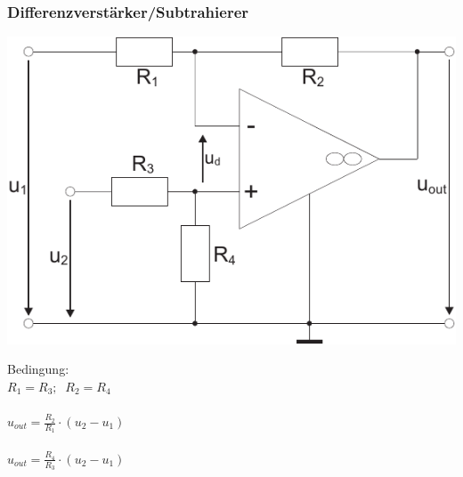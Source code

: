 \documentclass[a4paper,twocolumn,10pt]{article}
\begin{document}
\subsubsection*{Differenzverstärker/Subtrahierer}
\begin{minipage}[b]{0.25\textwidth}
\includegraphics[width=\textwidth]{Grafiken/OP_PDiffV}
\end{minipage}
\hfill
\begin{minipage}[b]{0.2\textwidth}
Bedingung:\\
$R_1=R_3;\;\;R_2=R_4$\\\\
$u_{out}=\frac{R_2}{R_1}\cdot (u_2-u_1)$\\\\
$u_{out}=\frac{R_4}{R_3}\cdot (u_2-u_1)$\\\\
\end{minipage}
\end{document}
